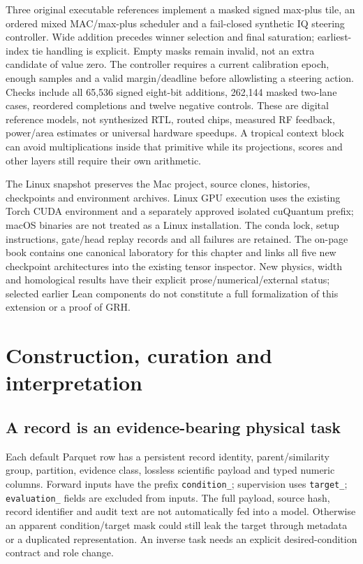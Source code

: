 \documentclass[11pt]{article}
\theoremstyle{definition}\newtheorem{definition}[theorem]{Definition}
\theoremstyle{remark}\newtheorem{remark}[theorem]{Remark}
\begin{document}
Three original executable references implement a masked signed max-plus
tile, an ordered mixed MAC/max-plus scheduler and a fail-closed synthetic
IQ steering controller. Wide addition precedes winner selection and final
saturation; earliest-index tie handling is explicit. Empty masks remain
invalid, not an extra candidate of value zero. The controller requires a
current calibration epoch, enough samples and a valid margin/deadline before
allowlisting a steering action. Checks include all 65,536 signed eight-bit
additions, 262,144 masked two-lane cases, reordered completions and twelve
negative controls. These are digital reference models, not synthesized
RTL, routed chips, measured RF feedback, power/area estimates or universal
hardware speedups. A tropical context block can avoid multiplications
inside that primitive while its projections, scores and other layers still
require their own arithmetic.

The Linux snapshot preserves the Mac project, source clones, histories,
checkpoints and environment archives. Linux GPU execution uses the existing
Torch CUDA environment and a separately approved isolated cuQuantum prefix;
macOS binaries are not treated as a Linux installation. The conda lock,
setup instructions, gate/head replay records and all failures are retained.
The on-page book contains one canonical laboratory for this chapter and
links all five new checkpoint architectures into the existing tensor
inspector. New physics, width and homological results have their explicit
prose/numerical/external status; selected earlier Lean components do not
constitute a full formalization of this extension or a proof of GRH.

\section{Construction, curation and interpretation}
\subsection{A record is an evidence-bearing physical task}
Each default Parquet row has a persistent record identity, parent/similarity
group, partition, evidence class, lossless scientific payload and typed numeric
columns. Forward inputs have the prefix \texttt{condition\_}; supervision uses
\texttt{target\_}; \texttt{evaluation\_} fields are excluded from inputs.
The full payload, source hash, record identifier and audit text are not
automatically fed into a model. Otherwise an apparent condition/target mask
could still leak the target through metadata or a duplicated representation.
An inverse task needs an explicit desired-condition contract and role change.
\end{document}
